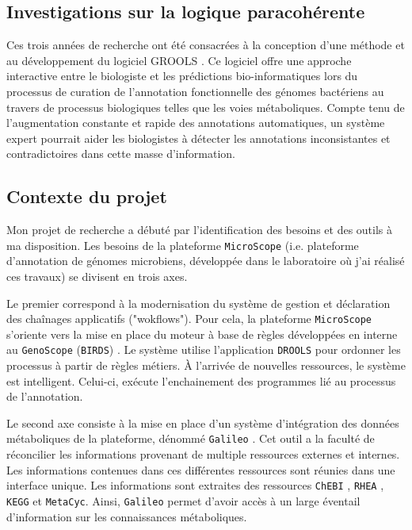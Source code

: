 \begin{refsegment}
\chapter{Investigations sur la logique paracohérente}

Ces trois années de recherche ont été consacrées à la conception d’une méthode et au développement du logiciel \gls{GROOLS} . Ce logiciel offre une approche interactive entre le biologiste et les prédictions bio-informatiques lors du processus de curation de l'annotation fonctionnelle des génomes bactériens au travers de processus biologiques telles que les voies métaboliques. Compte tenu de l'augmentation constante et rapide des annotations automatiques, un système expert pourrait aider les biologistes à détecter les annotations inconsistantes et contradictoires dans cette masse d'information. 

\section{Contexte du projet}

Mon projet de recherche a débuté par l'identification des besoins et des outils à ma disposition. Les besoins de la plateforme \texttt{MicroScope} (i.e. plateforme d’annotation de génomes microbiens, développée dans le laboratoire où j’ai réalisé ces travaux) se divisent en trois axes.

Le premier correspond à la modernisation du système de gestion et déclaration des chaînages applicatifs ("wokflows"). Pour cela, la plateforme \texttt{MicroScope} s'oriente vers la mise en place du moteur à base de règles développées en interne au \texttt{GenoScope} (\texttt{\gls{BIRDS}}) . Le système utilise l'application \texttt{DROOLS}\cite{mcwhirter2001drools,browne2009jboss} pour ordonner les processus à partir de règles métiers. À l'arrivée de nouvelles ressources, le système est intelligent. Celui-ci, exécute l’enchainement des programmes lié au processus de l'annotation.

Le second axe consiste à la mise en place d'un système d'intégration des données métaboliques de la plateforme, dénommé \texttt{Galileo} \cite{galileo2014}. Cet outil a la faculté de réconcilier les informations provenant de multiple ressources externes et internes. Les informations contenues dans ces différentes ressources sont réunies dans une interface unique. Les informations sont extraites des ressources \texttt{ChEBI} \cite{hastings2013chebi}, \texttt{RHEA} \cite{alcantara2012rhea}, \texttt{KEGG} et \texttt{MetaCyc}. Ainsi, \texttt{Galileo} permet d'avoir accès à un large éventail d'information sur les connaissances métaboliques. 


\end{refsegment}
